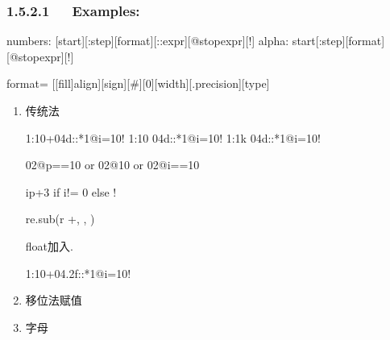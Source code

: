 \documentclass[letterpaper,12pt,english]{sphinxmanual}
\begin{document}
\subsubsection{1.5.2.1   Examples:}
\label{\detokenize{001software/001install/sublime:examples}}
\begin{sphinxVerbatim}[commandchars=\\\{\}]
numbers: [\PYGZlt{}start\PYGZgt{}][:\PYGZlt{}step\PYGZgt{}][\PYGZti{}\PYGZlt{}format\PYGZgt{}][::\PYGZlt{}expr\PYGZgt{}][@\PYGZlt{}stopexpr\PYGZgt{}][!]
alpha:   \PYGZlt{}start\PYGZgt{}[:\PYGZlt{}step\PYGZgt{}][\PYGZti{}\PYGZlt{}format\PYGZgt{}][@\PYGZlt{}stopexpr\PYGZgt{}][!]
\end{sphinxVerbatim}

format= {[}{[}fill{]}align{]}{[}sign{]}{[}\#{]}{[}0{]}{[}width{]}{[}.precision{]}{[}type{]}
\begin{enumerate}
%
\item {} 
传统法

\begin{sphinxVerbatim}[commandchars=\\\{\}]
1:1\PYGZti{}0\PYGZgt{}+\PYGZsh{}04d::\PYGZus{}*1@i\PYGZgt{}=10!
1:1\PYGZti{}0\PYGZgt{} \PYGZsh{}04d::\PYGZus{}*1@i\PYGZgt{}=10!
1:1\PYGZti{}k\PYGZgt{} \PYGZsh{}04d::\PYGZus{}*1@i\PYGZgt{}=10!

\PYGZti{}02@p==10 or \PYGZti{}02@\PYGZus{}\PYGZgt{}10 or \PYGZti{}02@i==10

i\textbar{}p+3 if i!= 0 else \PYGZus{}!

\textbar{}re.sub(r\PYGZsq{} +\PYGZsq{}, \PYGZsq{} \PYGZsq{}, \PYGZus{})

float加入.

1:1\PYGZti{}0\PYGZgt{}+\PYGZsh{}04.2f::\PYGZus{}*1@i\PYGZgt{}=10!
\end{sphinxVerbatim}

\item {} 
移位法赋值

\begin{sphinxVerbatim}[commandchars=\\\{\}]
\end{sphinxVerbatim}

\item {} 
字母

\begin{sphinxVerbatim}[commandchars=\\\{\}]
  
\end{sphinxVerbatim}

\end{enumerate}
\end{document}
